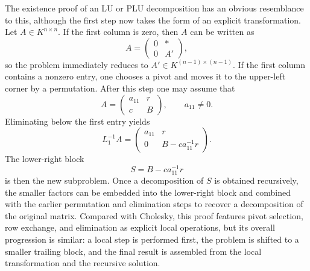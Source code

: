 \documentclass[pdflatex,sn-mathphys-num]{sn-jnl}%
\theoremstyle{thmstyleone}%
\theoremstyle{thmstyletwo}%
\theoremstyle{thmstylethree}%
\begin{document}
The existence proof of an LU or PLU decomposition has an obvious resemblance to this, although the first step now takes the form of an explicit transformation. Let \(A \in K^{n \times n}\). If the first column is zero, then \(A\) can be written as
\[
A=
\begin{pmatrix}
0 & *\\
0 & A'
\end{pmatrix},
\]
so the problem immediately reduces to \(A' \in K^{(n-1)\times(n-1)}\). If the first column contains a nonzero entry, one chooses a pivot and moves it to the upper-left corner by a permutation. After this step one may assume that
\[
A=
\begin{pmatrix}
a_{11} & r\\
c & B
\end{pmatrix},
\qquad a_{11}\neq 0.
\]
Eliminating below the first entry yields
\[
L_1^{-1}A=
\begin{pmatrix}
a_{11} & r\\
0 & B-ca_{11}^{-1}r
\end{pmatrix}.
\]
The lower-right block
\[
S=B-ca_{11}^{-1}r
\]
is then the new subproblem. Once a decomposition of \(S\) is obtained recursively, the smaller factors can be embedded into the lower-right block and combined with the earlier permutation and elimination steps to recover a decomposition of the original matrix. Compared with Cholesky, this proof features pivot selection, row exchange, and elimination as explicit local operations, but its overall progression is similar: a local step is performed first, the problem is shifted to a smaller trailing block, and the final result is assembled from the local transformation and the recursive solution.
\end{document}
